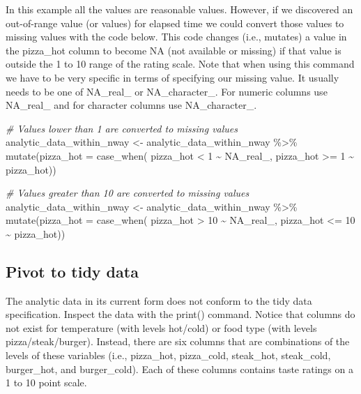 \documentclass[
]{krantz}
\makeatletter
\newenvironment{Shaded}{\begin{snugshade}}{\end{snugshade}}
\newcommand{\AttributeTok}[1]{\textcolor[rgb]{0.61,0.61,0.61}{#1}}
\newcommand{\CommentTok}[1]{\textcolor[rgb]{0.37,0.37,0.37}{\textit{#1}}}
\newcommand{\ConstantTok}[1]{\textcolor[rgb]{0,0,0}{#1}}
\newcommand{\DecValTok}[1]{\textcolor[rgb]{0.06,0.06,0.06}{#1}}
\newcommand{\FunctionTok}[1]{\textcolor[rgb]{0,0,0}{#1}}
\newcommand{\NormalTok}[1]{#1}
\newcommand{\OtherTok}[1]{\textcolor[rgb]{0.37,0.37,0.37}{#1}}
\newcommand{\SpecialCharTok}[1]{\textcolor[rgb]{0,0,0}{#1}}
\newenvironment{kframe}{%
\medskip{}
\setlength{\fboxsep}{.8em}
 \def\at@end@of@kframe{}%
 \ifinner\ifhmode%
  \def\at@end@of@kframe{\end{minipage}}%
  \begin{minipage}{\columnwidth}%
 \fi\fi%
 \def\FrameCommand##1{\hskip\@totalleftmargin \hskip-\fboxsep
 \colorbox{shadecolor}{##1}\hskip-\fboxsep
     \hskip-\linewidth \hskip-\@totalleftmargin \hskip\columnwidth}%
 \MakeFramed {\advance\hsize-\width
   \@totalleftmargin\z@ \linewidth\hsize
   \@setminipage}}%
 {\par\unskip\endMakeFramed%
 \at@end@of@kframe}
\renewenvironment{Shaded}{\begin{kframe}}{\end{kframe}}
\makeatother
\begin{document}
In this example all the values are reasonable values. However, if we discovered an out-of-range value (or values) for elapsed time we could convert those values to missing values with the code below. This code changes (i.e., mutates) a value in the pizza\_hot column to become NA (not available or missing) if that value is outside the 1 to 10 range of the rating scale. Note that when using this command we have to be very specific in terms of specifying our missing value. It usually needs to be one of NA\_real\_ or NA\_character\_. For numeric columns use NA\_real\_ and for character columns use NA\_character\_.

\begin{Shaded}
\begin{Highlighting}[]
\CommentTok{\# Values lower than 1 are converted to missing values}
\NormalTok{analytic\_data\_within\_nway }\OtherTok{\textless{}{-}}\NormalTok{ analytic\_data\_within\_nway  }\SpecialCharTok{\%\textgreater{}\%} 
    \FunctionTok{mutate}\NormalTok{(}\AttributeTok{pizza\_hot =} \FunctionTok{case\_when}\NormalTok{(}
\NormalTok{      pizza\_hot }\SpecialCharTok{\textless{}} \DecValTok{1}  \SpecialCharTok{\textasciitilde{}} \ConstantTok{NA\_real\_}\NormalTok{,}
\NormalTok{      pizza\_hot }\SpecialCharTok{\textgreater{}=} \DecValTok{1} \SpecialCharTok{\textasciitilde{}}\NormalTok{ pizza\_hot))}

\CommentTok{\# Values greater than 10 are converted to missing values}
\NormalTok{analytic\_data\_within\_nway }\OtherTok{\textless{}{-}}\NormalTok{ analytic\_data\_within\_nway  }\SpecialCharTok{\%\textgreater{}\%} 
    \FunctionTok{mutate}\NormalTok{(}\AttributeTok{pizza\_hot =} \FunctionTok{case\_when}\NormalTok{(}
\NormalTok{      pizza\_hot }\SpecialCharTok{\textgreater{}} \DecValTok{10}  \SpecialCharTok{\textasciitilde{}} \ConstantTok{NA\_real\_}\NormalTok{,}
\NormalTok{      pizza\_hot }\SpecialCharTok{\textless{}=} \DecValTok{10} \SpecialCharTok{\textasciitilde{}}\NormalTok{ pizza\_hot))}
\end{Highlighting}
\end{Shaded}

\hypertarget{pivot-to-tidy-data-1}{%
\subsection{Pivot to tidy data}\label{pivot-to-tidy-data-1}}

The analytic data in its current form does not conform to the tidy data specification. Inspect the data with the print() command. Notice that columns do not exist for temperature (with levels hot/cold) or food type (with levels pizza/steak/burger). Instead, there are six columns that are combinations of the levels of these variables (i.e., pizza\_hot, pizza\_cold, steak\_hot, steak\_cold, burger\_hot, and burger\_cold). Each of these columns contains taste ratings on a 1 to 10 point scale.
\end{document}
